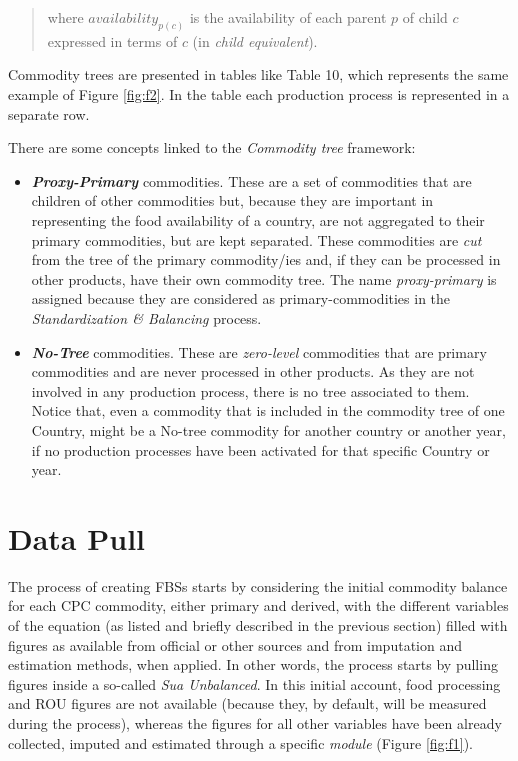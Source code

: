 \documentclass[]{article}
\providecommand{\tightlist}{%
  \setlength{\itemsep}{0pt}\setlength{\parskip}{0pt}}
\begin{document}
\begin{quote}
where \(availability_{p(c)}\) is the availability of each parent \(p\)
of child \(c\) expressed in terms of \(c\) (in \emph{child equivalent}).
\end{quote}

Commodity trees are presented in tables like Table 10, which represents
the same example of Figure \ref{fig:f2}. In the table each production
process is represented in a separate row.

There are some concepts linked to the \emph{Commodity tree} framework:

\begin{itemize}
\tightlist
\item
  \textbf{\emph{Proxy-Primary}} commodities. These are a set of
  commodities that are children of other commodities but, because they
  are important in representing the food availability of a country, are
  not aggregated to their primary commodities, but are kept separated.
  These commodities are \emph{cut} from the tree of the primary
  commodity/ies and, if they can be processed in other products, have
  their own commodity tree. The name \emph{proxy-primary} is assigned
  because they are considered as primary-commodities in the
  \emph{Standardization \& Balancing} process.
\item
  \textbf{\emph{No-Tree}} commodities. These are \emph{zero-level}
  commodities that are primary commodities and are never processed in
  other products. As they are not involved in any production process,
  there is no tree associated to them. Notice that, even a commodity
  that is included in the commodity tree of one Country, might be a
  No-tree commodity for another country or another year, if no
  production processes have been activated for that specific Country or
  year.
\end{itemize}

\section{Data Pull}\label{data-pull}

The process of creating FBSs starts by considering the initial commodity
balance for each CPC commodity, either primary and derived, with the
different variables of the equation (as listed and briefly described in
the previous section) filled with figures as available from official or
other sources and from imputation and estimation methods, when applied.
In other words, the process starts by pulling figures inside a so-called
\emph{Sua Unbalanced}. In this initial account, food processing and ROU
figures are not available (because they, by default, will be measured
during the process), whereas the figures for all other variables have
been already collected, imputed and estimated through a specific
\emph{module} (Figure \ref{fig:f1}).
\end{document}
